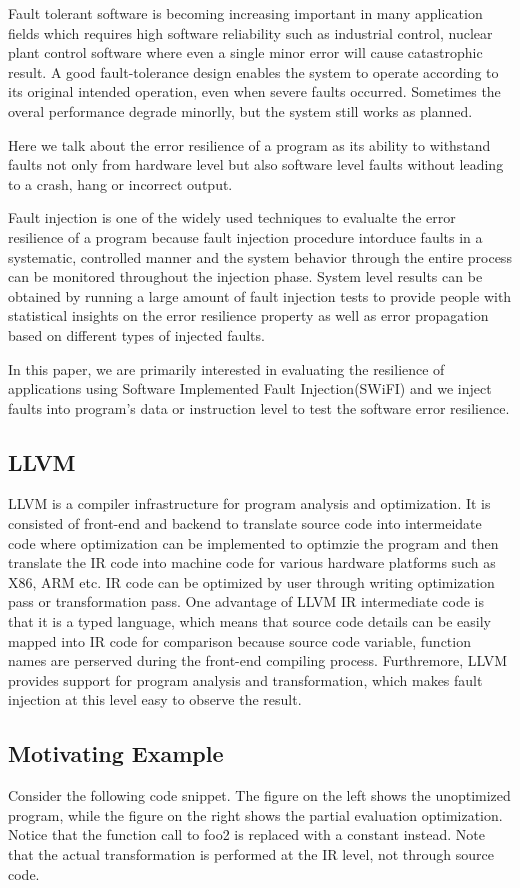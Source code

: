 Fault tolerant software is becoming increasing important in many application fields which requires high software reliability such as industrial control, nuclear plant control software where even a single minor error will cause catastrophic result.
A good fault-tolerance design enables the system to operate according to its original intended operation, even when severe faults occurred.
Sometimes the overal performance degrade minorlly, but the system still works as planned. 

Here we talk about the error resilience of a program as its ability to withstand faults not only from hardware level but also software level faults without leading to a crash, hang or incorrect output. 

Fault injection is one of the widely used techniques to evalualte the error resilience of a program because fault injection procedure intorduce faults in a systematic, controlled manner and the system behavior through the entire process can be monitored throughout the injection phase. System level results can be obtained by running a large amount of fault injection tests to provide people with statistical insights on the error resilience property as well as error propagation based on different types of injected faults.

In this paper, we are primarily interested in evaluating the resilience of applications using Software Implemented Fault Injection(SWiFI) and we inject faults into program's data or instruction level to test the software error resilience.

\subsection{LLVM}
LLVM is a compiler infrastructure for program analysis and optimization. It is consisted of front-end and backend to translate source code into intermeidate code where optimization can be implemented to optimzie the program and then translate the IR code into machine code for various hardware platforms such as X86, ARM etc. IR code can be optimized by user through writing optimization pass or transformation pass.
One advantage of LLVM IR intermediate code is that it is a typed language, which means that source code details can be easily mapped into IR code for comparison because source code variable, function names are perserved during the front-end compiling process. 
Furthremore, LLVM provides support for program analysis and transformation, which makes fault injection at this level easy to observe the result.

\subsection{Motivating Example}
Consider the following code snippet.
The figure on the left shows the unoptimized program, while the figure on the right shows the partial evaluation optimization.
Notice that the function call to foo2 is replaced with a constant instead.
Note that the actual transformation is performed at the IR level, not through source code.
